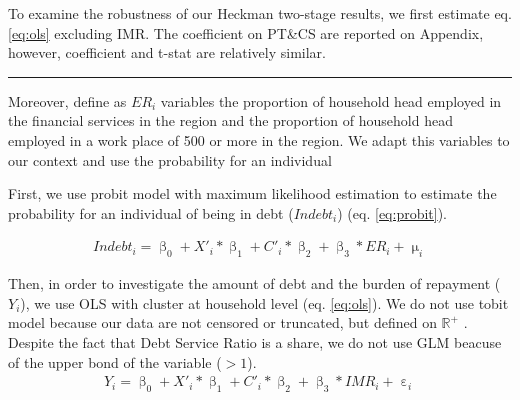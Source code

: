 \documentclass[a4paper, 11pt, onecolumn]{article}
\begin{document}
To examine the robustness of our Heckman two-stage results, we first estimate eq. \ref{eq:ols} excluding IMR. 
The coefficient on PT\&CS are reported on Appendix, however, coefficient and t-stat are relatively similar.
\par\noindent\rule{\textwidth}{0.4pt}

Moreover, \cite{Bertaut2002} define as $ER_{i}$ variables the proportion of household head employed in the financial services in the region and the proportion of household head employed in a work place of 500 or more in the region.
We adapt this variables to our context and use the probability for an individual 


First, we use probit model with maximum likelihood estimation to estimate the probability for an individual of being in debt ($Indebt_{i}$) (eq. \ref{eq:probit}).


\begin{equation}\label{eq:probit}
\begin{split}
Indebt_{i}=\upbeta_{0}+X'_{i}*\upbeta_{1}+C'_{i}*\upbeta_{2}+\upbeta_{3}*ER_{i}+\upmu_{i}
\end{split}
\end{equation}

Then, in order to investigate the amount of debt and the burden of repayment ($Y_{i}$), we use OLS with cluster at household level (eq. \ref{eq:ols}).
We do not use tobit model because our data are not censored or truncated, but defined on $\mathbb{R}^{+}$ \citep{Maddala1991}.
Despite the fact that Debt Service Ratio is a share, we do not use GLM beacuse of the upper bond of the variable ($>1$).
\begin{equation}\label{eq:ols}
\begin{split}
Y_{i}=\upbeta_{0}+X'_{i}*\upbeta_{1}+C'_{i}*\upbeta_{2}+\upbeta_{3}*IMR_{i}+\upepsilon_i
\end{split}
\end{equation}
\end{document}
